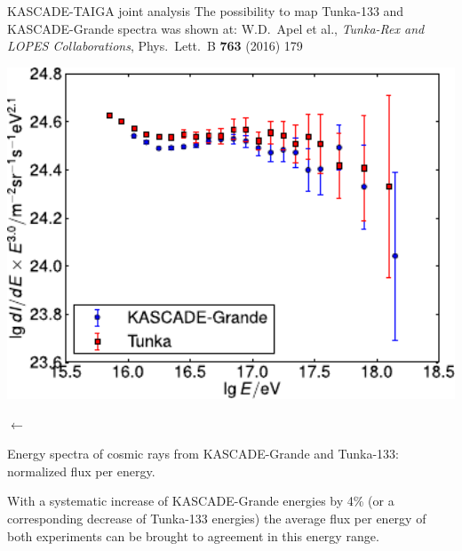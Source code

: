\begin{frame}{KASCADE-TAIGA joint analysis}
\small
The possibility to map Tunka-133 and KASCADE-Grande spectra was shown at: W.D.~Apel et al., \textit{Tunka-Rex and LOPES Collaborations}, Phys.\ Lett.\ B \textbf{763} (2016) 179
\begin{center}
    \begin{minipage}{0.50\textwidth}
        \includegraphics[width=1\textwidth]{pics/KG_tunka133_scales.pdf}
    \end{minipage}
     $\longleftarrow$~
\begin{minipage}{0.38\textwidth}
  Energy spectra of cosmic rays from KASCADE-Grande and Tunka-133: normalized flux per energy.
\end{minipage}
\end{center}

With a systematic increase of
KASCADE-Grande energies by 4\% (or a corresponding decrease of Tunka-133 energies)
the average flux per energy of both experiments can be brought to agreement
in this energy range.
\end{frame}

